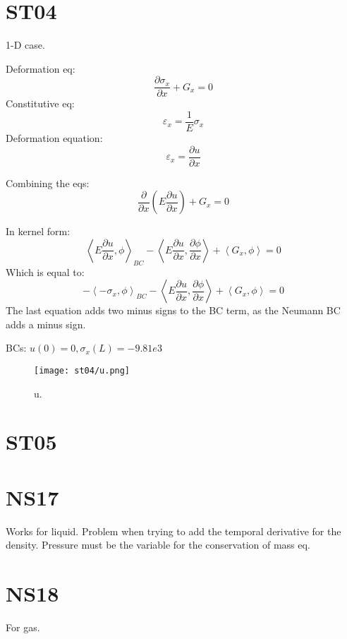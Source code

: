 \documentclass[11pt,letterpaper]{article}
\begin{document}
\section{ST04}

1-D case.

Deformation eq:
\begin{equation}
\frac{\partial \sigma_x}{\partial x} + G_x = 0
\end{equation}
Constitutive eq:
\begin{equation}
\varepsilon_x = \frac{1}{E} \sigma_x
\end{equation}
Deformation equation:
\begin{equation}
\varepsilon_x = \frac{\partial u}{\partial x}
\end{equation}

Combining the eqs:
\begin{equation}
\frac{\partial}{\partial x}(E \frac{\partial u}{\partial x}) + G_x = 0
\end{equation}

In kernel form:
\begin{equation}
\left< E \frac{\partial u}{\partial x}, \phi \right>_{BC} - \left< E \frac{\partial u}{\partial x}, \frac{\partial \phi}{\partial x} \right>
+ \left< G_x , \phi \right> = 0
\end{equation}
Which is equal to:
\begin{equation}
-\left< -\sigma_x, \phi \right>_{BC} - \left< E \frac{\partial u}{\partial x}, \frac{\partial \phi}{\partial x} \right>
+ \left< G_x , \phi \right> = 0
\end{equation}
The last equation adds two minus signs to the BC term, as the Neumann BC adds a minus sign.

BCs: $u(0)=0, \sigma_x(L)=-9.81e3$

\begin{figure*}[!h]
	\centering
	\texttt{[image: st04/u.png]}
	\hfill
	\caption{u.}
	\label{fig:st04}
\end{figure*}

\section{ST05}

\section{NS17}

Works for liquid. Problem when trying to add the temporal derivative for the density.
Pressure must be the variable for the conservation of mass eq.

\section{NS18}

For gas.


\pagebreak 


\end{document}
